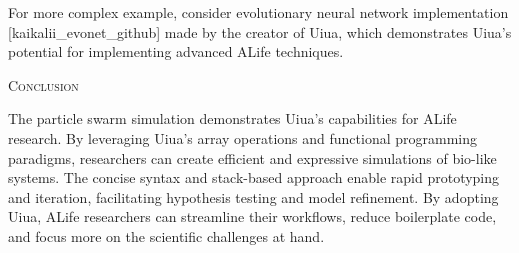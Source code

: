 For more complex example, consider evolutionary neural network
implementation {[}kaikalii\_evonet\_github{]} made by the creator of
Uiua, which demonstrates Uiua's potential for implementing advanced
ALife techniques.

\textsc{Conclusion}

The particle swarm simulation demonstrates Uiua's capabilities for ALife
research. By leveraging Uiua's array operations and functional
programming paradigms, researchers can create efficient and expressive
simulations of bio-like systems. The concise syntax and stack-based
approach enable rapid prototyping and iteration, facilitating hypothesis
testing and model refinement. By adopting Uiua, ALife researchers can
streamline their workflows, reduce boilerplate code, and focus more on
the scientific challenges at hand.
